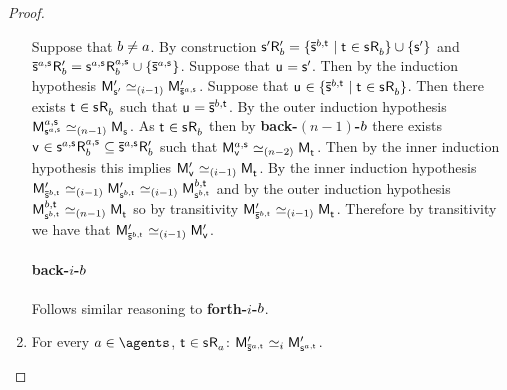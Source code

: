 \begin{proof}
\begin{enumerate}
        Suppose that $b \neq a$.
        By construction $\aStateSP \aAccessibilityP{\agentB} = \{\aPStateS[\agentB,\aStateT] \mid \aStateT \in \aStateS \aAccessibility{\agentB}\} \cup \{\aStateSP\}$ and $\aPStateS[\agentA,\aStateS] \aAccessibilityP{\agentB} = \aStateS[\agentA,\aStateS] \aAccessibility[\agentA,\aStateS]{\agentB} \cup \{\aPStateS[\agentA,\aStateS]\}$. 
        Suppose that $\aStateU = \aStateSP$. 
        Then by the induction hypothesis $\aPModelP{\aStateSP} \bisimilar[(i-1)] \aPModelP{\aPStateS[\agentA,\aStateS]}$.
        Suppose that $\aStateU \in \{\aPStateS[\agentB,\aStateT] \mid \aStateT \in \aStateS \aAccessibility{\agentB}\}$. 
        Then there exists $\aStateT \in \aStateS \aAccessibility{\agentB}$ such that $\aStateU = \aPStateS[\agentB,\aStateT]$.
        By the outer induction hypothesis $\aPModel[\agentA,\aStateS]{\aStateS[\agentA,\aStateS]} \bisimilar[(n - 1)] \aPModel{\aStateS}$.
        As $\aStateT \in \aStateS \aAccessibility{\agentB}$ then by {\bf back-$(n-1)$-$b$} there exists $\aStateV \in \aStateS[\agentA,\aStateS] \aAccessibility[\agentA,\aStateS]{\agentB} \subseteq \aPStateS[\agentA,\aStateS] \aAccessibilityP{\agentB}$ such that $\aPModel[\agentA,\aStateS]{\aStateV} \bisimilar[(n - 2)] \aPModel{\aStateT}$.
        Then by the inner induction hypothesis this implies $\aPModelP{\aStateV} \bisimilar[(i - 1)] \aPModel{\aStateT}$.
        By the inner induction hypothesis $\aPModelP{\aPStateS[\agentB,\aStateT]} \bisimilar[(i - 1)] \aPModelP{\aStateS[\agentB,\aStateT]} \bisimilar[(i - 1)] \aPModel[\agentB,\aStateT]{\aStateS[\agentB,\aStateT]}$ and by the outer induction hypothesis $\aPModel[\agentB,\aStateT]{\aStateS[\agentB,\aStateT]} \bisimilar[(n - 1)] \aPModel{\aStateT}$ so by transitivity $\aPModelP{\aPStateS[\agentB,\aStateT]} \bisimilar[(i - 1)] \aPModel{\aStateT}$.
        Therefore by transitivity we have that $\aPModelP{\aPStateS[\agentB,\aStateT]} \bisimilar[(i - 1)] \aPModelP{\aStateV}$.

        \paragraph{back-$i$-$b$} Follows similar reasoning to {\bf forth-$i$-$b$}.

    \item 
        For every $\agentA \in \agents$, $\aStateT \in \aStateS \aAccessibility{\agentA}$: $\aPModelP{\aPStateS[\agentA,\aStateT]} \bisimilar[i] \aPModelP{\aStateS[\agentA,\aStateT]}$.


\end{enumerate}
\end{proof}
